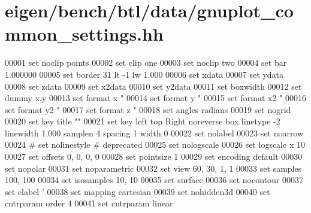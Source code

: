 \hypertarget{eigen_2bench_2btl_2data_2gnuplot__common__settings_8hh_source}{}\section{eigen/bench/btl/data/gnuplot\+\_\+common\+\_\+settings.hh}
\label{eigen_2bench_2btl_2data_2gnuplot__common__settings_8hh_source}

\begin{DoxyCode}
00001 \textcolor{keyword}{set} noclip points
00002 \textcolor{keyword}{set} clip one
00003 \textcolor{keyword}{set} noclip two
00004 \textcolor{keyword}{set} bar 1.000000
00005 set border 31 lt -1 lw 1.000
00006 set xdata
00007 \textcolor{keyword}{set} ydata
00008 \textcolor{keyword}{set} zdata
00009 \textcolor{keyword}{set} x2data
00010 \textcolor{keyword}{set} y2data
00011 \textcolor{keyword}{set} boxwidth
00012 \textcolor{keyword}{set} dummy x,y
00013 \textcolor{keyword}{set} format x \textcolor{stringliteral}{"%
00014 \textcolor{keyword}{set} format y \textcolor{stringliteral}{"%
00015 \textcolor{keyword}{set} format x2 \textcolor{stringliteral}{"%
00016 \textcolor{keyword}{set} format y2 \textcolor{stringliteral}{"%
00017 \textcolor{keyword}{set} format z \textcolor{stringliteral}{"%
00018 \textcolor{keyword}{set} angles radians
00019 \textcolor{keyword}{set} nogrid
00020 \textcolor{keyword}{set} key title \textcolor{stringliteral}{""}
00021 \textcolor{keyword}{set} key left top Right noreverse box linetype -2 linewidth 1.000 samplen 4 spacing 1 width 0
00022 \textcolor{keyword}{set} nolabel
00023 \textcolor{keyword}{set} noarrow
00024 \textcolor{preprocessor}{# set nolinestyle # deprecated}
00025 \textcolor{keyword}{set} nologscale
00026 \textcolor{keyword}{set} logscale x 10
00027 \textcolor{keyword}{set} offsets 0, 0, 0, 0
00028 \textcolor{keyword}{set} pointsize 1
00029 \textcolor{keyword}{set} encoding \textcolor{keywordflow}{default}
00030 \textcolor{keyword}{set} nopolar
00031 \textcolor{keyword}{set} noparametric
00032 \textcolor{keyword}{set} view 60, 30, 1, 1
00033 \textcolor{keyword}{set} samples 100, 100
00034 \textcolor{keyword}{set} isosamples 10, 10
00035 \textcolor{keyword}{set} surface
00036 \textcolor{keyword}{set} nocontour
00037 \textcolor{keyword}{set} clabel \textcolor{stringliteral}{'%
00038 \textcolor{keyword}{set} mapping cartesian
00039 \textcolor{keyword}{set} nohidden3d
00040 \textcolor{keyword}{set} cntrparam order 4
00041 \textcolor{keyword}{set} cntrparam linear
}}}}}}
\end{DoxyCode}
